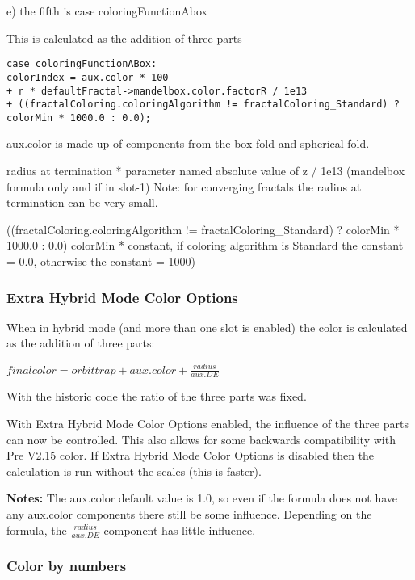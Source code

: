 e) the fifth is case coloringFunctionAbox

This is calculated as the addition of three parts

\filbreak
\begin{lstlisting}
case coloringFunctionABox:
colorIndex = aux.color * 100 
+ r * defaultFractal->mandelbox.color.factorR / 1e13 
+ ((fractalColoring.coloringAlgorithm != fractalColoring_Standard) ? colorMin * 1000.0 : 0.0); 
\end{lstlisting}

aux.color is made up of components from the box fold and spherical fold.

radius at termination * parameter named absolute value of z  / 1e13 (mandelbox formula only and if in slot-1) Note: for converging fractals the radius at termination can be very small.

((fractalColoring.coloringAlgorithm != fractalColoring_Standard) ? colorMin * 1000.0 : 0.0)
colorMin * constant, if coloring algorithm is Standard the constant = 0.0, otherwise the constant = 1000)


\subsubsection{Extra Hybrid Mode Color Options}\label{materials-extra-hybrid-mode-color-options}

When in hybrid mode (and more than one slot is enabled) the color is calculated as the addition of three parts:

\(final color = orbit trap  +  aux.color  +  \frac{radius}{aux.DE}\)

With the historic code the ratio of the three parts was fixed.

With Extra Hybrid Mode Color Options enabled, the influence of the three parts can now be controlled. This also allows for some backwards compatibility with Pre V2.15 color. If Extra Hybrid Mode Color Options is disabled then the calculation is run without the scales (this is faster).

\textbf{Notes: }The aux.color default value is 1.0, so even if the formula does not have any aux.color components there still be some influence. Depending on the formula, the \(\frac{radius}{aux.DE}\) component has little influence.

\subsubsection{Color by numbers}\label{materials-color-by-numbers}

